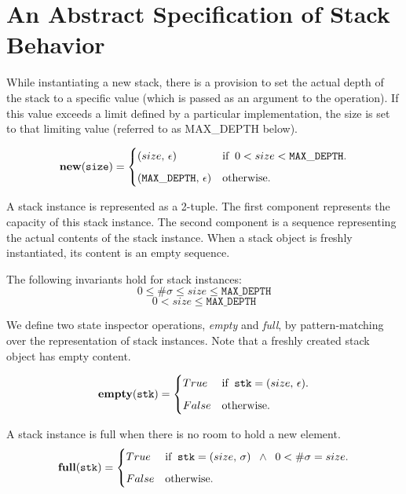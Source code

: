 \documentclass[10pt]{article}
\begin{document}
  \section{An Abstract Specification of Stack Behavior}
    While instantiating a new stack, there is a provision to set the actual depth of the stack to a specific value (which is passed as an argument to the operation). If this value exceeds a limit defined by a particular implementation, the size is set to that limiting value (referred to as MAX\_DEPTH below).

    \[
        \mathtt{\mathbf{new}(size)} = \begin{cases} (size, \,  \epsilon) &\mbox{if\;\;} 0 < size < \mathtt{MAX\_DEPTH}. \vspace*{6pt}\\ 
        (\mathtt{MAX\_DEPTH}, \, \epsilon) & \mbox{otherwise}. \end{cases} 
    \]
    
    A stack instance is represented as a 2-tuple. The first component represents the capacity of this stack instance. The second component is a sequence representing the actual contents of the stack instance. When a stack object is freshly instantiated, its content is an empty sequence. 

    The following invariants hold for stack instances:
    \[
        0 \leq \#\sigma \leq size \leq \mathtt{MAX\_DEPTH}
    \]
    \[
        0 < size \leq \mathtt{MAX\_DEPTH}
    \]

    We define two state inspector operations, \emph{empty} and \emph{full}, by pattern-matching over the representation of stack instances. Note that a freshly created stack object has empty content.
    
    \[
        \mathtt{\mathbf{empty}(stk)} = \begin{cases} True & \mbox{if\;\;} \mathtt{stk} = (size, \,\epsilon). \vspace*{6pt}\\ 
        False & \mbox{otherwise}. \end{cases} 
    \]
  
    A stack instance is full when there is no room to hold a new element.
    \[
        \mathtt{\mathbf{full}(stk)} = \begin{cases} True & \mbox{if\;\;} \mathtt{stk} = (size, \,\sigma) \;\; \wedge \;\; 0 < \#\sigma = size. \vspace*{6pt}\\
        False & \mbox{otherwise}. \end{cases} 
    \]
\end{document}
